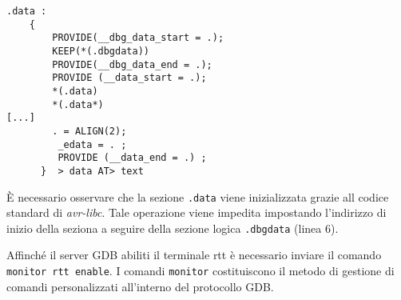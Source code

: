 \noindent\begin{minipage}{\textwidth}
    \begin{lstlisting}[label=lst:link-rtt, caption={Sezione del linker script modificato per la compilazione della libraria rtt.}]
    .data : 
    {
        PROVIDE(__dbg_data_start = .);
        KEEP(*(.dbgdata))
        PROVIDE(__dbg_data_end = .);
        PROVIDE (__data_start = .);
        *(.data)
        *(.data*)
[...]
        . = ALIGN(2);
         _edata = . ;
         PROVIDE (__data_end = .) ;
      }  > data AT> text
    \end{lstlisting}
\end{minipage}

È necessario osservare che la sezione \texttt{.data} viene inizializzata grazie all codice standard di \textit{avr-libc}. Tale operazione viene impedita impostando l'indirizzo di inizio della seziona a seguire della sezione logica \texttt{.dbgdata} (linea 6). 

Affinché il server GDB abiliti il terminale rtt è necessario inviare il comando \texttt{monitor rtt enable}.
I comandi \texttt{monitor} costituiscono il metodo di gestione di comandi personalizzati all'interno del protocollo GDB.\@